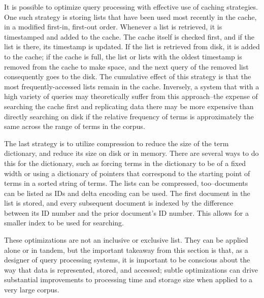 \documentclass[11pt]{article}
\begin{document}
  It is possible to optimize query processing with effective use of caching strategies.
  One such strategy is storing lists that have been used most recently in the cache, in a modified first-in, first-out order.
  Whenever a list is retrieved, it is timestamped and added to the cache.
  The cache itself is checked first, and if the list is there, its timestamp is updated.
  If the list is retrieved from disk, it is added to the cache; if the cache is full, the list or lists with the oldest timestamp is removed from the cache to make space, and the next query of the removed list consequently goes to the disk.
  The cumulative effect of this strategy is that the most frequently-accessed lists remain in the cache.
  Inversely, a system that with a high variety of queries may theoretically suffer from this approach--the expense of searching the cache first and replicating data there may be more expensive than directly searching on disk if the relative frequency of terms is approximately the same across the range of terms in the corpus.
  
  The last strategy is to utilize compression to reduce the size of the term dictionary, and reduce its size on disk or in memory.
  There are several ways to do this for the dictionary, such as forcing terms in the dictionary to be of a fixed width or using a dictionary of pointers that correspond to the starting point of terms in a sorted string of terms.
  The lists can be compressed, too--documents can be listed as IDs and delta encoding can be used.
  The first document in the list is stored, and every subsequent document is indexed by the difference between its ID number and the prior document's ID number.
  This allows for a smaller index to be used for searching.
  
  These optimizations are not an inclusive or exclusive list.
  They can be applied alone or in tandem, but the important takeaway from this section is that, as a designer of query processing systems, it is important to be conscious about the way that data is represented, stored, and accessed; subtle optimizations can drive substantial improvements to processing time and storage size when applied to a very large corpus.
  
\end{document}
